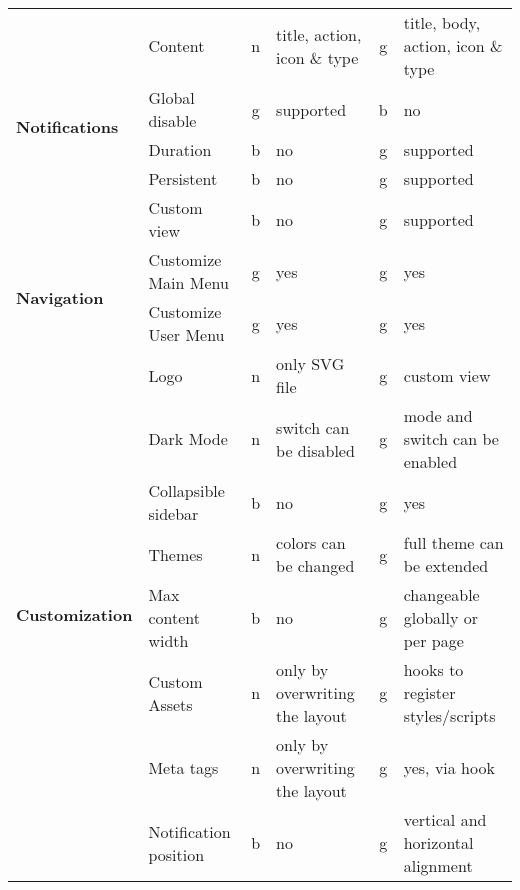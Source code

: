 \begin{table}[!ht]
{\begin{tabular}{llclcl}
            \hline
            \multirow{5}{*}{\textbf{Notifications}}  & Content                & n  & title, action, icon \& type     & g  & title, body, action, icon \& type        \\
            & Global disable         & g  & supported                      & b  & no                                      \\
            & Duration               & b  & no                             & g  & supported                               \\
            & Persistent             & b  & no                             & g  & supported                               \\
            & Custom view            & b  & no                             & g  & supported                               \\
            \hline
            \multirow{2}{*}{\textbf{Navigation}}     & Customize Main Menu    & g  & yes                            & g  & yes                                     \\
            & Customize User Menu    & g  & yes                            & g  & yes                                     \\
            \hline
            \multirow{10}{*}{\textbf{Customization}} & Logo                   & n  & only SVG file                  & g  & custom view                             \\
            & Dark Mode              & n  & switch can be disabled         & g  & mode and switch can be enabled          \\
            & Collapsible sidebar    & b  & no                             & g  & yes                                     \\
            & Themes                 & n  & colors can be changed          & g  & full theme can be extended              \\
            & Max content width      & b  & no                             & g  & changeable globally or per page          \\
            & Custom Assets          & n  & only by overwriting the layout & g  & hooks to register styles/scripts        \\
            & Meta tags              & n  & only by overwriting the layout & g  & yes, via hook                           \\
            & Notification position  & b  & no                             & g  & vertical and horizontal alignment       \\

\end{tabular}}
\end{table}
